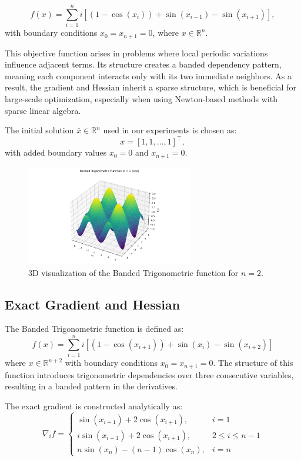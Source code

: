 \documentclass[a4paper,12pt]{article}
\begin{document}
	\[
	f(x) = \sum_{i=1}^{n} i \left[ (1 - \cos(x_i)) + \sin(x_{i-1}) - \sin(x_{i+1}) \right],
	\]
	with boundary conditions \( x_0 = x_{n+1} = 0 \), where \( x \in \mathbb{R}^n \).
	
	This objective function arises in problems where local periodic variations influence adjacent terms. Its structure creates a banded dependency pattern, meaning each component interacts only with its two immediate neighbors. As a result, the gradient and Hessian inherit a sparse structure, which is beneficial for large-scale optimization, especially when using Newton-based methods with sparse linear algebra.
	
	The initial solution \( \bar{x} \in \mathbb{R}^n \) used in our experiments is chosen as:
	\[
	\bar{x} = [1, 1, \dots, 1]^\top,
	\]
	with added boundary values \( x_0 = 0 \) and \( x_{n+1} = 0 \).
	
		\begin{figure}[htbp]
		\centering
		\includegraphics[width=0.65\textwidth]{../immagini/banded_3D.png}
		\caption{3D visualization of the Banded Trigonometric function for $n=2$.}
		\label{fig:broyden3D}
	\end{figure}
	
	\newpage
	\subsection{Exact Gradient and Hessian}
	
	The Banded Trigonometric function is defined as:
	\[
	f(x) = \sum_{i=1}^{n} i \left[ (1 - \cos(x_{i+1})) + \sin(x_i) - \sin(x_{i+2}) \right]
	\]
	where \(x \in \mathbb{R}^{n+2}\) with boundary conditions \(x_0 = x_{n+1} = 0\). The structure of this function introduces trigonometric dependencies over three consecutive variables, resulting in a banded pattern in the derivatives.
	
	The exact gradient is constructed analytically as:
	\[
	\nabla_i f = 
	\begin{cases}
		\sin(x_{i+1}) + 2\cos(x_{i+1}), & i = 1 \\
		i\sin(x_{i+1}) + 2\cos(x_{i+1}), & 2 \le i \le n-1 \\
		n\sin(x_n) - (n-1)\cos(x_n), & i = n
	\end{cases}
	\]
	
\end{document}
